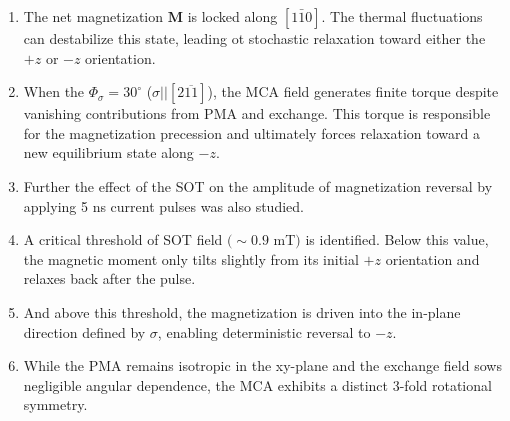 \begin{enumerate}
    \item The net magnetization $\mathrm{\textbf{M}}$ is locked along $[1\bar10]$. The thermal fluctuations can destabilize this state, leading ot stochastic relaxation toward either the $+z$ or $-z$ orientation.
    \item When the $\Phi_{\sigma}=30^\circ$ ($\sigma||[2\overline{11}]$), the MCA field generates finite torque despite vanishing contributions from PMA and exchange. This torque is responsible for the magnetization precession and ultimately forces relaxation toward a new equilibrium state along $-z$.
    \item Further the effect of the SOT on the amplitude of magnetization reversal by applying 5 ns current pulses was also studied.
    \item A critical threshold of SOT field $(\sim 0.9$ mT$)$ is identified. Below this value, the magnetic moment only tilts slightly from its initial $+z$ orientation and relaxes back after the pulse.
    \item And above this threshold, the magnetization is driven into the in-plane direction defined by $\sigma$, enabling deterministic reversal to $-z$.
    \item While the PMA remains isotropic in the xy-plane and the exchange field sows negligible angular dependence, the MCA exhibits a distinct 3-fold rotational symmetry.
\end{enumerate}
